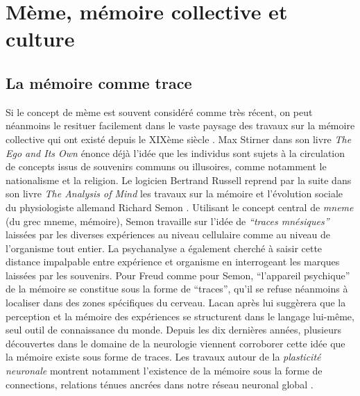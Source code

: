 \section[M\`eme, m\'emoire collective et culture]{M\`eme, m\'emoire collective et culture}
\subsection[La m\'emoire comme trace]{La m\'emoire comme trace}

Si le concept de m\`eme est souvent consid\'er\'e comme tr\`es r\'ecent, on peut n\'eanmoins le resituer facilement dans le vaste paysage des travaux sur la m\'emoire collective qui ont exist\'e depuis le XIX\`eme si\`ecle \citep{Laurent1999}. Max Stirner dans son livre \textit{The Ego and Its Own }\citeyear{Stirner1995} \'enonce d\'ej\`a l{\textquoteright}id\'ee que les individus sont sujets \`a la circulation de concepts issus de souvenirs communs ou illusoires, comme notamment le nationalisme et la religion. Le logicien Bertrand Russell reprend par la suite dans son livre \textit{The Analysis of Mind } \citeyear{Russell1921} les travaux sur la m\'emoire et l{\textquoteright}\'evolution sociale du physiologiste allemand Richard Semon \citeyear{Semon1923}. Utilisant le concept central de \textit{mneme} (du grec 
mneme, m\'emoire), Semon travaille sur l{\textquoteright}id\'ee de \textit{{\textquotedblleft}traces mn\'esiques{\textquotedblright} }laiss\'ees par les diverses exp\'eriences au niveau cellulaire comme au niveau de l{\textquoteright}organisme tout entier. La psychanalyse a \'egalement cherch\'e \`a saisir cette distance impalpable entre exp\'erience et organisme en interrogeant les marques laiss\'ees par les souvenirs. Pour Freud comme pour Semon, {\textquotedblleft}l{\textquoteright}appareil psychique{\textquotedblright} de la m\'emoire se constitue sous la forme de {\textquotedblleft}traces{\textquotedblright}, qu{\textquoteright}il se refuse n\'eanmoins \`a localiser dans des zones sp\'ecifiques du cerveau. Lacan apr\`es lui sugg\`erera que la perception et la m\'emoire des exp\'eriences se structurent dans le langage lui-m\^eme, seul outil de connaissance du monde. Depuis les dix derni\`eres ann\'ees, plusieurs d\'ecouvertes dans le domaine de la neurologie viennent corroborer cette id\'ee que la m\'emoire existe sous forme de traces. Les travaux autour de la \textit{plasticit\'e neuronale }montrent notamment l{\textquoteright}existence de la m\'emoire sous la forme de connections, relations t\'enues ancr\'ees dans notre r\'eseau neuronal global \citep{Magistretti2008}.  

